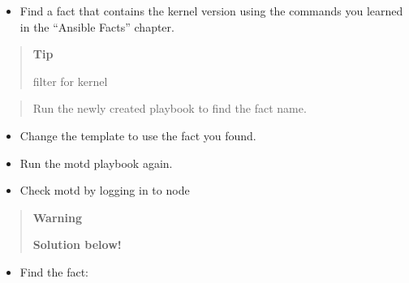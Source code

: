 \begin{itemize}
\tightlist
\item
  Find a fact that contains the kernel version using the commands you
  learned in the ``Ansible Facts'' chapter.
\end{itemize}

\begin{quote}
\textbf{Tip}

filter for kernel
\end{quote}

\begin{quote}
Run the newly created playbook to find the fact name.
\end{quote}

\begin{itemize}
\item
  Change the template to use the fact you found.
\item
  Run the motd playbook again.
\item
  Check motd by logging in to node
\end{itemize}

\begin{quote}
\textbf{Warning}

\textbf{Solution below!}
\end{quote}

\begin{itemize}
\tightlist
\item
  Find the fact:
\end{itemize}

\begin{Shaded}
\begin{Highlighting}[]
\PreprocessorTok{{-}{-}{-}}
\KeywordTok{{-}}\AttributeTok{ }\KeywordTok{:}
\AttributeTok{  }\KeywordTok{:}
\AttributeTok{  }\KeywordTok{:}
\AttributeTok{    }\KeywordTok{{-}}\AttributeTok{ }\KeywordTok{:}
\AttributeTok{      }\KeywordTok{:}
\AttributeTok{        }\KeywordTok{:}
\AttributeTok{          }\KeywordTok{{-}}\AttributeTok{ }
\AttributeTok{      }\KeywordTok{:}
\AttributeTok{    }\KeywordTok{{-}}\AttributeTok{ }\KeywordTok{:}
\AttributeTok{        }\KeywordTok{:}
\end{Highlighting}
\end{Shaded}

